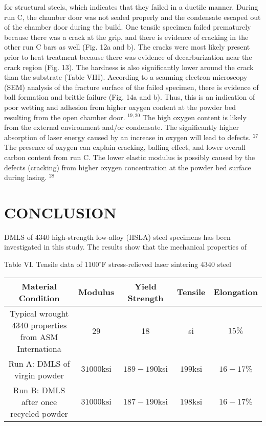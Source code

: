 \documentclass[10pt]{article}
\begin{document}
for structural steels, which indicates that they failed in a ductile manner. During run $\mathrm{C}$, the chamber door was not sealed properly and the condensate escaped out of the chamber door during the build. One tensile specimen failed prematurely because there was a crack at the grip, and there is evidence of cracking in the other run $\mathrm{C}$ bars as well (Fig. 12a and b). The cracks were most likely present prior to heat treatment because there was evidence of decarburization near the crack region (Fig. 13). The hardness is also significantly lower around the crack than the substrate (Table VIII). According to a scanning electron microscopy (SEM) analysis of the fracture surface of the failed specimen, there is evidence of ball formation and brittle failure (Fig. 14a and b). Thus, this is an indication of poor wetting and adhesion from higher oxygen content at the powder bed resulting from the open chamber door. ${ }^{19,20}$ The high oxygen content is likely from the external environment and/or condensate. The significantly higher absorption of laser energy caused by an increase in oxygen will lead to defects. ${ }^{27}$ The presence of oxygen can explain cracking, balling effect, and lower overall carbon content from run $\mathrm{C}$. The lower elastic modulus is possibly caused by the defects (cracking) from higher oxygen concentration at the powder bed surface during lasing. ${ }^{28}$

\section*{CONCLUSION}
DMLS of 4340 high-strength low-alloy (HSLA) steel specimens has been investigated in this study. The results show that the mechanical properties of

Table VI. Tensile data of $1100^{\circ} \mathrm{F}$ stress-relieved laser sintering 4340 steel

\begin{center}
\begin{tabular}{|c|c|c|c|c|}
\hline
Material Condition & Modulus & Yield Strength & Tensile & Elongation \\
\hline
Typical wrought 4340 properties from ASM Internationa & 29 & 18 & si & $15 \%$ \\
\hline
Run A: DMLS of virgin powder & $31000 \mathrm{ksi}$ & $189-190 \mathrm{ksi}$ & $199 \mathrm{ksi}$ & $16-17 \%$ \\
\hline
Run B: DMLS after once recycled powder & $31000 \mathrm{ksi}$ & $187-190 \mathrm{ksi}$ & $198 \mathrm{ksi}$ & $16-17 \%$ \\
\hline
\end{tabular}
\end{center}
\end{document}

